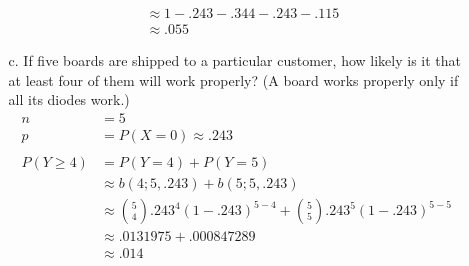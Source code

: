 \documentclass[letterpaper,12pt]{article}
\newcommand{\bp}[3]{%
  \binom{#2}{#1}#3^{#1}(1 - #3)^{#2 - #1}%
}
\begin{document}
\begin{enumerate}
\begin{enumerate}
\begin{align*}
          &\approx 1 - .243 - .344 - .243 - .115 \\
          &\approx .055
        \end{align*}
      \item[c.]
        If five boards are shipped to a particular customer, how likely is it that at least four of them will work properly? (A board works properly only if all its diodes work.)
        \begin{align*}
          n &= 5 \\
          p &= P(X = 0) \approx .243 \\
          \\
          P(Y \ge 4) &= P(Y = 4) + P(Y = 5) \\
          &\approx b(4; 5, .243) + b(5; 5, .243) \\
          &\approx \bp{4}{5}{.243} + \bp{5}{5}{.243} \\
          &\approx .0131975 + .000847289 \\
          &\approx .014
        \end{align*}
    \end{enumerate}
\end{enumerate}
\end{document}
